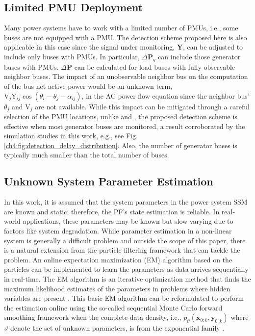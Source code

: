\subsection{Limited PMU Deployment}
Many power systems have to work with a limited number of PMUs, i.e., some buses are not equipped with a PMU. The detection scheme proposed here is also applicable in this case since the signal under monitoring, $\boldsymbol{Y}$, can be adjusted to include only buses with PMUs. In particular, $\Delta\textbf{P}_{g}$ can include those generator buses with PMUs. $\Delta\textbf{P}$ can be calculated for load buses with fully observable neighbor buses. The impact of an unobservable neighbor bus on the computation of the bus net active power would be an unknown term, $\text{V}_j \text{Y}_{ij} \cos (\theta_i - \theta_j - \alpha_{ij})$, in the AC power flow equation since the neighbor bus' $\theta_j$ and $\text{V}_j$ are not available. While this impact can be mitigated through a careful selection of the PMU locations, unlike \cite{Chen2016} and \cite{yang2020control}, the proposed detection scheme is effective when most generator buses are monitored, a result corroborated by the simulation studies in this work, e.g., see Fig. \ref{ch4:fig:detection_delay_distribution}. Also, the number of generator buses is typically much smaller than the total number of buses.

\subsection{Unknown System Parameter Estimation}
In this work, it is assumed that the system parameters in the power system SSM are known and static; therefore, the PF's state estimation is reliable. In real-world applications, these parameters may be known but slow-varying due to factors like system degradation. While parameter estimation in a non-linear system is generally a difficult problem and outside the scope of this paper, there is a natural extension from the particle filtering framework that can tackle the problem. An online expectation maximization (EM) algorithm based on the particles can be implemented to learn the parameters as data arrives sequentially in real-time. The EM algorithm is an iterative optimization method that finds the maximum likelihood estimates of the parameters in problems where hidden variables are present \cite{dempster1977maximum}. This basic EM algorithm can be reformulated to perform the estimation online using the so-called sequential Monte Carlo forward smoothing framework when the complete-data density, i.e., $p_\vartheta(\boldsymbol{x}_{0:k}, {\boldsymbol{y}}_{0:k})$ where $\vartheta$ denote the set of unknown parameters, is from the exponential family \cite{yildirim2013online}.


